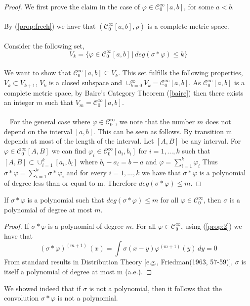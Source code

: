 \documentclass[../main.tex]{subfiles}
\begin{document}
	\begin{proof}
		We first prove the claim in the case of $\varphi \in \mathcal{C}^\infty_0[a,b]$, for some $a<b$. \\ \\ By (\ref{prop:frech}) we have that $(\mathcal{C}^\infty_0[a,b],\rho)$ is a complete metric space.  \\ \\  Consider the following set, \\ $$V_k= \{\varphi \in \mathcal{C}_0^\infty[a,b] \, | \,  deg(\sigma \ast \varphi ) \leq k\}$$ \\ We want to show that $\mathcal{C}_0^\infty[a,b] \subseteq V_k.$ This set fulfills the following properties, $V_k \subset V_{k+1}$, $V_k $ is a closed subspace and $\cup_{k=0}^\infty V_k = \mathcal{C}_0^\infty[a,b]$. As $\mathcal{C}_0^\infty[a,b]$ is a complete metric space, by Baire's Category Theorem (\ref{baire}) then there exists an integer $m$ such that $V_m=\mathcal{C}_0^\infty[a,b]$. \\ \\ 
		For the general case where $\varphi \in \mathcal{C}_0^\infty$, we note that the number $m$ does not depend on the interval $[a,b]$. This can be seen as follows. By transition m depends at most of the length of the interval. Let $[A,B]$ be any interval. For $\varphi \in \mathcal{C}^\infty_0[A,B]$ we can find $\varphi_i \in \mathcal{C}^\infty_0[a_i,b_i]$ for $i=1,...,k$ such that $[A,B] \subset \cup_{i=1}^k[a_i,b_i]$ where $b_i -a_i =b-a$ and $\varphi=\sum_{i=1}^k \varphi_i$ Thus $\sigma \ast \varphi = \sum_{i=1}^k \sigma \ast \varphi_i$ and for every $i=1,...,k $ we have that $\sigma \ast \varphi$ is a polynomial of degree less than or equal to m. Therefore $deg(\sigma \ast \varphi) \leq m$.
	\end{proof}
	\begin{lema} %
		If $\sigma \ast \varphi$ is a polynomial such that $ deg (\sigma \ast \varphi) \leq m$ for all $\varphi \in \mathcal{C}^\infty_0$, then $\sigma$ is a polynomial of degree at most $m$. 
	\end{lema}
	\begin{proof} 
	If $\sigma \ast \varphi$ is a polynomial of degree $m$.
	For all $\varphi \in \mathcal{C}^\infty_0$, using (\ref{prop:2}) we have that
	$$(\sigma \ast \varphi)^{(m+1)} \, (x)=\int \sigma(x-y)\varphi^{(m+1)}(y) \, dy= 0$$  
	From standard results in Distribution Theory [e.g., Friedman(1963, 57-59)], $\sigma $ is itself a polynomial of degree at most m (a.e.).
	\end{proof} 
\noindent We showed indeed that if $\sigma$ is not a polynomial, then it follows that the convolution $\sigma \ast \varphi$ is not a polynomial. \\ \\
\end{document}
